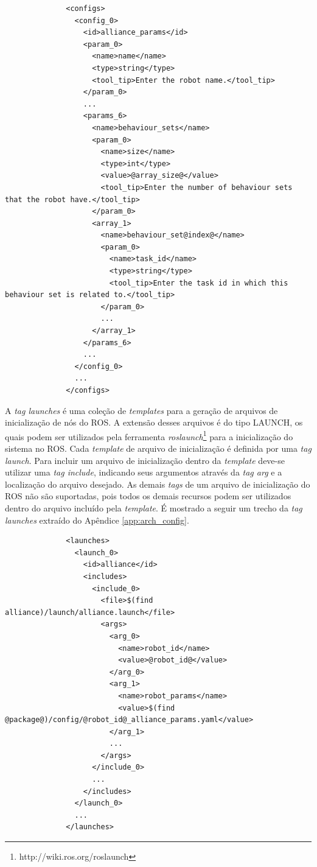             \begin{lstlisting}
              <configs>
                <config_0>
                  <id>alliance_params</id>
                  <param_0>
                    <name>name</name>
                    <type>string</type>
                    <tool_tip>Enter the robot name.</tool_tip>
                  </param_0>
                  ...
                  <params_6>
                    <name>behaviour_sets</name>
                    <param_0>
                      <name>size</name>
                      <type>int</type>
                      <value>@array_size@</value>
                      <tool_tip>Enter the number of behaviour sets that the robot have.</tool_tip>
                    </param_0>
                    <array_1>
                      <name>behaviour_set@index@</name>
                      <param_0>
                        <name>task_id</name>
                        <type>string</type>
                        <tool_tip>Enter the task id in which this behaviour set is related to.</tool_tip>
                      </param_0>
                      ...
                    </array_1>
                  </params_6>
                  ...
                </config_0>
                ...
              </configs>
            \end{lstlisting}
            
            A \textit{tag launches} é uma coleção de \textit{templates} para a geração de arquivos de inicialização de nós do ROS. A extensão desses arquivos é do tipo LAUNCH, os quais podem ser utilizados pela ferramenta \textit{roslaunch}\footnote{http://wiki.ros.org/roslaunch} para a inicialização do sistema no ROS. Cada \textit{template} de arquivo de inicialização é definida por uma \textit{tag launch}. Para incluir um arquivo de inicialização dentro da \textit{template} deve-se utilizar uma \textit{tag include}, indicando seus argumentos através da \textit{tag arg} e a localização do arquivo desejado. As demais \textit{tags} de um arquivo de inicialização do ROS não são suportadas, pois todos os demais recursos podem ser utilizados dentro do arquivo incluído pela \textit{template}. É mostrado a seguir um trecho da \textit{tag launches} extraído do Apêndice \ref{app:arch_config}.
            
            \begin{lstlisting}
              <launches>
                <launch_0>
                  <id>alliance</id>
                  <includes>
                    <include_0>
                      <file>$(find alliance)/launch/alliance.launch</file>
                      <args>
                        <arg_0>
                          <name>robot_id</name>
                          <value>@robot_id@</value>
                        </arg_0>
                        <arg_1>
                          <name>robot_params</name>
                          <value>$(find @package@)/config/@robot_id@_alliance_params.yaml</value>
                        </arg_1>
                        ...
                      </args>
                    </include_0>
                    ...
                  </includes>
                </launch_0>
                ...
              </launches>
            \end{lstlisting}
            
